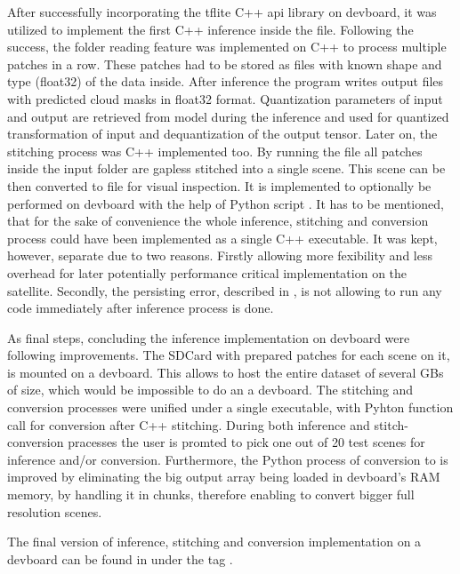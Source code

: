 {After successfully incorporating the \gls{tflite} C++ \gls{api} library on \gls{devboard},
it was utilized to implement the first C++ inference inside the  file. Following the success,
the folder reading feature was implemented on C++ to process multiple patches in a row.
These patches had to be stored as  files with known shape and type (\gls{float32}) of the data inside.
After inference the program writes output  files with predicted cloud masks in \gls{float32} format.
Quantization parameters of input and output are retrieved from model during the inference and used for quantized transformation of input and dequantization of the output tensor.
Later on, the stitching process was C++ implemented too.
By running the  file all  patches inside the input folder are gapless stitched into a single  scene.
This  scene can be then converted to  file for visual inspection.
It is implemented to optionally be performed on \gls{devboard} with the help of Python script .
It has to be mentioned, that for the sake of convenience the whole inference, stitching and conversion process could have been implemented as a single C++ executable.
It was kept, however, separate due to two reasons. Firstly allowing more fexibility and less overhead for later potentially performance critical implementation on the satellite.
Secondly, the persisting error, described in , is not allowing to run any code immediately after inference process is done.

As final steps, concluding the inference implementation on \gls{devboard} were following improvements.
The SDCard with prepared  patches for each scene on it, is mounted on a \gls{devboard}. This allows to host the entire dataset of several GBs of size,
which would be impossible to do an a \gls{devboard}.
The stitching and conversion processes were unified under a single executable, with Pyhton function call for conversion after C++  stitching.
During both inference and stitch-conversion pracesses the user is promted to pick one out of 20 test scenes for inference and/or conversion.
Furthermore, the Python process of conversion to  is improved by eliminating the big output array being loaded in \gls{devboard}'s RAM memory,
by handling it in chunks, therefore enabling to convert bigger full resolution scenes.

The final version of inference, stitching and conversion implementation on a \gls{devboard} can be found in  under the tag .

}
